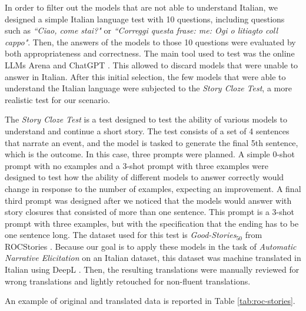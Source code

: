 In order to filter out the models that are not able to understand Italian, we designed a simple Italian language test with 10 questions, including questions such as  \emph{``Ciao, come stai?"} or \emph{``Correggi questa frase: me: Ogi o litiagto coll cappo"}.  Then, the answers of the models to those 10 questions were evaluated by both appropriateness and correctness. The main tool used to test was the online LLMs Arena \cite{arena} and ChatGPT \cite{chatgpt}. This allowed to discard models that were unable to answer in Italian. After this initial selection, the few models that were able to understand the Italian language were subjected to the \emph{Story Cloze Test}, a more realistic test for our scenario.

The \emph{Story Cloze Test} \cite{mostafazadeh2016corpus} is a test designed to test the ability of various models to understand and continue a short story. The test consists of a set of 4 sentences that narrate an event, and the model is tasked to generate the final 5th sentence, which is the outcome. In this case, three prompts were planned. A simple 0-shot prompt with no examples and a 3-shot prompt with three examples were designed to test how the ability of different models to answer correctly would change in response to the number of examples, expecting an improvement. A final third prompt was designed after we noticed that the models would answer with story closures that consisted of more than one sentence. This prompt is a 3-shot prompt with three examples, but with the specification that the ending has to be one sentence long. The dataset used for this test is \emph{Good-Stories$_{50}$} from ROCStories \cite{mostafazadeh2016corpus}. Because our goal is to apply these models in the task of  \emph{Automatic Narrative Elicitation} on an Italian dataset, this dataset was machine translated in Italian using DeepL \cite{deepl}. Then, the resulting translations were manually reviewed for wrong translations and lightly retouched for non-fluent translations.

An example of original and translated data is reported in Table \ref{tab:roc-stories}.

